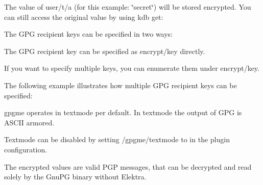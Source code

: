 The value of {\ttfamily user/t/a} (for this example\+: \char`\"{}secret\char`\"{}) will be stored encrypted. You can still access the original value by using {\ttfamily kdb get}\+:


\begin{DoxyCode}{0}
\end{DoxyCode}


The G\+PG recipient keys can be specified in two ways\+:


\begin{DoxyEnumerate}
\item The G\+PG recipient key can be specified as {\ttfamily encrypt/key} directly.
\item If you want to specify multiple keys, you can enumerate them under {\ttfamily encrypt/key}.
\end{DoxyEnumerate}

The following example illustrates how multiple G\+PG recipient keys can be specified\+:


\begin{DoxyCode}{0}
\end{DoxyCode}


{\ttfamily gpgme} operates in textmode per default. In textmode the output of G\+PG is A\+S\+C\+II armored.

Textmode can be disabled by setting {\ttfamily /gpgme/textmode} to {} in the plugin configuration.

The encrypted values are valid P\+GP messages, that can be decrypted and read solely by the Gnu\+PG binary without Elektra. 
